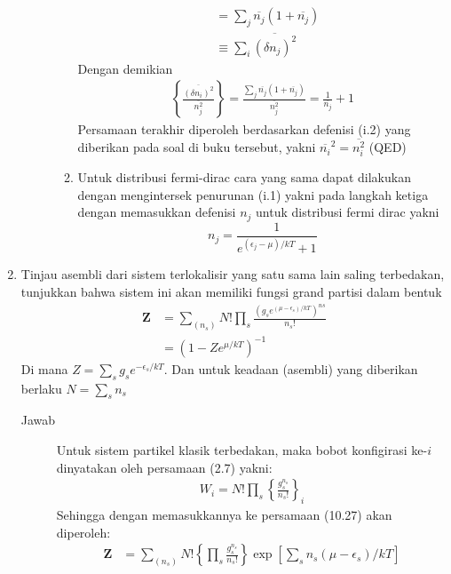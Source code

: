 \documentclass[a4paper , 12 pt]{article}
\begin{document}
\begin{enumerate}
\begin{description}
\begin{enumerate}
\begin{align}
		\nonumber \\
		& = \sum_j \overline{n_j} (1+ \overline{n_j}) \nonumber \tag{i.1} \\
		& \equiv  \sum_i \overline{(\delta n_j )^2} \nonumber \tag{i.2}
		\end{align}
		Dengan demikian 
		\begin{align}
			\left \{ \frac{\overline{(\delta n_i)^2}}{\overline{n_j^2}} \right\}= \frac{ \sum_j \overline{n_j} (1+ \overline{n_j})}{\overline{n_j^2}} = \frac{1}{\overline{n_j}} +1 \tag{i.3}
		\end{align}
		Persamaan terakhir diperoleh berdasarkan defenisi (i.2) yang diberikan pada soal di buku tersebut, yakni $\overline{n_i}^2 = \overline{n_i^2}$ (QED)
	\item
		Untuk distribusi fermi-dirac cara yang sama dapat dilakukan dengan mengintersek penurunan (i.1) yakni pada langkah ketiga  dengan memasukkan defenisi $n_j$ untuk distribusi fermi dirac yakni
		\[
		 n_j = \frac{1}{e^{(\epsilon_j -\mu)/kT} + 1} \tag{QED}
		\]
	\end{enumerate}
	\end{description}
\item 
	Tinjau asembli dari sistem terlokalisir yang satu sama lain saling terbedakan, tunjukkan bahwa sistem ini akan memiliki fungsi grand partisi dalam bentuk
	\begin{align}
	\boldsymbol{Z} & = \sum_{(n_s)} N ! \prod_s \frac{(g_s e^{(\mu - \epsilon_s)/kT})^{ns}}{n_s !} \nonumber \\
	& = (1 - Z e^{\mu/ kT})^{-1} \nonumber
	\end{align}
	Di mana $Z = \displaystyle \sum_s g_s e^{-\epsilon_s /kT }$. Dan   untuk keadaan (asembli) yang diberikan  berlaku $N = \displaystyle \sum_s n_s$
	\newline
	\begin{description}
	\item[Jawab] 
	Untuk sistem partikel klasik terbedakan, maka bobot konfigirasi ke-$i$  dinyatakan oleh persamaan (2.7) yakni:
	\begin{align}
	W_i = N ! \prod_s \left \{ \frac{g_s^{n_s}}{n_s !} \right \}_i \nonumber
	\end{align}
	Sehingga dengan memasukkannya ke persamaan (10.27) akan diperoleh:
	\begin{align}
	\boldsymbol{Z} & = \sum_{(n_s)} N !\left \{ \prod_s \frac{g_s^{n_s}}{n_s !}  \right \} \exp \left[ \sum_s n_s (\mu - \epsilon_s)/kT \right] \nonumber \\

\end{align}
\end{description}
\end{enumerate}
\end{document}
